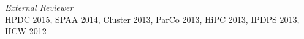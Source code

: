 {\sl External Reviewer} \\
HPDC 2015, SPAA 2014, Cluster 2013, ParCo 2013, HiPC 2013, IPDPS 2013, HCW 2012 \\


